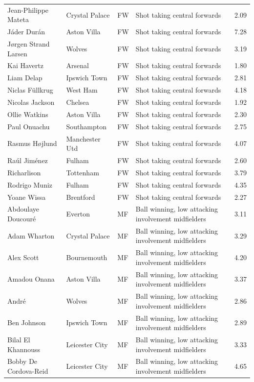 \begin{longtable}{p{3.4cm}p{2.5cm}p{1.0cm}p{5.0cm}r}
Jean-Philippe Mateta & Crystal Palace & FW & Shot taking central forwards & 2.09 \\
Jáder Durán & Aston Villa & FW & Shot taking central forwards & 7.28 \\
Jørgen Strand Larsen & Wolves & FW & Shot taking central forwards & 3.19 \\
Kai Havertz & Arsenal & FW & Shot taking central forwards & 1.80 \\
Liam Delap & Ipswich Town & FW & Shot taking central forwards & 2.81 \\
Niclas Füllkrug & West Ham & FW & Shot taking central forwards & 4.18 \\
Nicolas Jackson & Chelsea & FW & Shot taking central forwards & 1.92 \\
Ollie Watkins & Aston Villa & FW & Shot taking central forwards & 2.30 \\
Paul Onuachu & Southampton & FW & Shot taking central forwards & 2.75 \\
Rasmus Højlund & Manchester Utd & FW & Shot taking central forwards & 4.07 \\
Raúl Jiménez & Fulham & FW & Shot taking central forwards & 2.60 \\
Richarlison & Tottenham & FW & Shot taking central forwards & 3.79 \\
Rodrigo Muniz & Fulham & FW & Shot taking central forwards & 4.35 \\
Yoane Wissa & Brentford & FW & Shot taking central forwards & 2.27 \\
Abdoulaye Doucouré & Everton & MF & Ball winning, low attacking involvement midfielders & 3.11 \\
Adam Wharton & Crystal Palace & MF & Ball winning, low attacking involvement midfielders & 3.29 \\
Alex Scott & Bournemouth & MF & Ball winning, low attacking involvement midfielders & 4.20 \\
Amadou Onana & Aston Villa & MF & Ball winning, low attacking involvement midfielders & 3.37 \\
André & Wolves & MF & Ball winning, low attacking involvement midfielders & 2.86 \\
Ben Johnson & Ipswich Town & MF & Ball winning, low attacking involvement midfielders & 2.89 \\
Bilal El Khannouss & Leicester City & MF & Ball winning, low attacking involvement midfielders & 3.33 \\
Bobby De Cordova-Reid & Leicester City & MF & Ball winning, low attacking involvement midfielders & 4.65 \\

\end{longtable}
